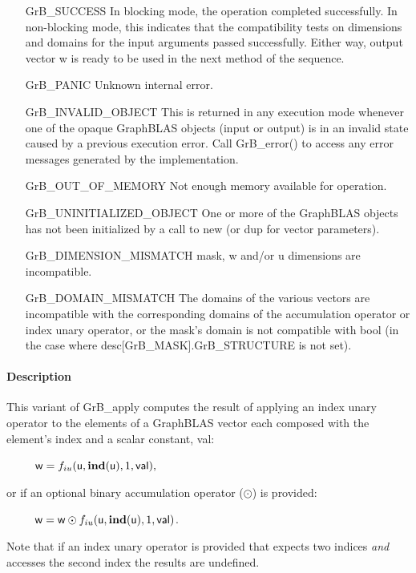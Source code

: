 \begin{itemize}[leftmargin=2.2in]
    \item[{\sf GrB\_SUCCESS}]         In blocking mode, the operation completed
    successfully. In non-blocking mode, this indicates that the compatibility 
    tests on dimensions and domains for the input arguments passed successfully. 
    Either way, output vector {\sf w} is ready to be used in the next method of 
    the sequence.

    \item[{\sf GrB\_PANIC}]           Unknown internal error.

    \item[{\sf GrB\_INVALID\_OBJECT}] This is returned in any execution mode 
    whenever one of the opaque GraphBLAS objects (input or output) is in an invalid 
    state caused by a previous execution error.  Call {\sf GrB\_error()} to access 
    any error messages generated by the implementation.

    \item[{\sf GrB\_OUT\_OF\_MEMORY}] Not enough memory available for operation.

    \item[{\sf GrB\_UNINITIALIZED\_OBJECT}] One or more of the GraphBLAS objects
    has not been initialized by a call to {\sf new} (or {\sf dup} for vector
    parameters).

    \item[{\sf GrB\_DIMENSION\_MISMATCH}]  {\sf mask}, {\sf w} and/or {\sf u}
    dimensions are incompatible.

    \item[{\sf GrB\_DOMAIN\_MISMATCH}]    The domains of the various vectors are
    incompatible with the corresponding domains of the accumulation operator
    or index unary operator, or the mask's domain is not compatible with {\sf bool}
    (in the case where {\sf desc[GrB\_MASK].GrB\_STRUCTURE} is not set).
\end{itemize}

\paragraph{Description}

{\color{red}
This variant of {\sf GrB\_apply} computes the result of applying an index unary operator
to the elements of a GraphBLAS vector each composed with the element's index and 
a scalar constant, {\sf val}:
\begin{itemize}[leftmargin=2.1in]
\item[~] ${\sf w} = f_{iu}({\sf u}, \bold{ind}({\sf u}), 1, {\sf val}),$
\end{itemize}
or if an optional binary accumulation operator ($\odot$) is provided:
\begin{itemize}[leftmargin=2.1in]
\item[~] ${\sf w} = {\sf w} \odot f_{iu}({\sf u}, \bold{ind}({\sf u}), 1, {\sf val})$.  
\end{itemize}
Note that if an index unary operator is provided that expects two indices {\it and} 
accesses the second index the results are undefined.}

